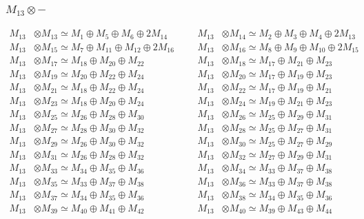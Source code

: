 \subsubsection{$ M_{13}\otimes -$}
\begin{align*}
M_{13} &\otimes M_{13} \simeq M_{1} \oplus M_{5} \oplus M_{6} \oplus 2M_{14} &&& M_{13} &\otimes M_{14} \simeq M_{2} \oplus M_{3} \oplus M_{4} \oplus 2M_{13}\\
M_{13} &\otimes M_{15} \simeq M_{7} \oplus M_{11} \oplus M_{12} \oplus 2M_{16} &&& M_{13} &\otimes M_{16} \simeq M_{8} \oplus M_{9} \oplus M_{10} \oplus 2M_{15}\\
M_{13} &\otimes M_{17} \simeq M_{18} \oplus M_{20} \oplus M_{22} &&& M_{13} &\otimes M_{18} \simeq M_{17} \oplus M_{21} \oplus M_{23}\\
M_{13} &\otimes M_{19} \simeq M_{20} \oplus M_{22} \oplus M_{24} &&& M_{13} &\otimes M_{20} \simeq M_{17} \oplus M_{19} \oplus M_{23}\\
M_{13} &\otimes M_{21} \simeq M_{18} \oplus M_{22} \oplus M_{24} &&& M_{13} &\otimes M_{22} \simeq M_{17} \oplus M_{19} \oplus M_{21}\\
M_{13} &\otimes M_{23} \simeq M_{18} \oplus M_{20} \oplus M_{24} &&& M_{13} &\otimes M_{24} \simeq M_{19} \oplus M_{21} \oplus M_{23}\\
M_{13} &\otimes M_{25} \simeq M_{26} \oplus M_{28} \oplus M_{30} &&& M_{13} &\otimes M_{26} \simeq M_{25} \oplus M_{29} \oplus M_{31}\\
M_{13} &\otimes M_{27} \simeq M_{28} \oplus M_{30} \oplus M_{32} &&& M_{13} &\otimes M_{28} \simeq M_{25} \oplus M_{27} \oplus M_{31}\\
M_{13} &\otimes M_{29} \simeq M_{26} \oplus M_{30} \oplus M_{32} &&& M_{13} &\otimes M_{30} \simeq M_{25} \oplus M_{27} \oplus M_{29}\\
M_{13} &\otimes M_{31} \simeq M_{26} \oplus M_{28} \oplus M_{32} &&& M_{13} &\otimes M_{32} \simeq M_{27} \oplus M_{29} \oplus M_{31}\\
M_{13} &\otimes M_{33} \simeq M_{34} \oplus M_{35} \oplus M_{36} &&& M_{13} &\otimes M_{34} \simeq M_{33} \oplus M_{37} \oplus M_{38}\\
M_{13} &\otimes M_{35} \simeq M_{33} \oplus M_{37} \oplus M_{38} &&& M_{13} &\otimes M_{36} \simeq M_{33} \oplus M_{37} \oplus M_{38}\\
M_{13} &\otimes M_{37} \simeq M_{34} \oplus M_{35} \oplus M_{36} &&& M_{13} &\otimes M_{38} \simeq M_{34} \oplus M_{35} \oplus M_{36}\\
M_{13} &\otimes M_{39} \simeq M_{40} \oplus M_{41} \oplus M_{42} &&& M_{13} &\otimes M_{40} \simeq M_{39} \oplus M_{43} \oplus M_{44}\\

\end{align*}
